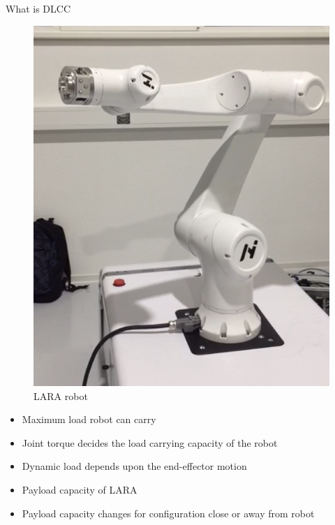 \begin{frame}{What is DLCC}
	
	\vspace{1cm}
	\begin{minipage}[c][\textheight][t]{0.4\textwidth}
	\begin{figure}	
	\centering %
	\includegraphics[height=0.65\textheight, width=0.5\textheight]{gazebo_elfin5.jpg}
	\caption{LARA robot}
	\end{figure}
	\end{minipage}\hfill
	\begin{minipage}[c][\textheight][t]{0.6\textwidth}
	\begin{itemize}
		\item Maximum load robot can carry %
		\pause
		\item Joint torque decides the load carrying capacity of the robot
		\pause
		\item Dynamic load depends upon the end-effector motion
		\pause
		\item Payload capacity of LARA %
		\pause
		\item Payload capacity changes for configuration close or away from robot
	\end{itemize}
	\end{minipage}

\end{frame}

